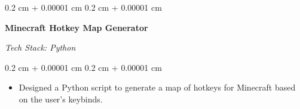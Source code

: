 \documentclass[10pt, a4paper]{article}
\newenvironment{highlights}{
    \begin{itemize}[
        topsep=0.1 cm,
        parsep=0.1 cm,
        partopsep=0pt,
        itemsep=0pt,
        leftmargin=0.4 cm + 10pt
    ]
}{
    \end{itemize}
} %
\newenvironment{onecolentry}{
    \begin{adjustwidth}{
        0.2 cm + 0.00001 cm
    }{
        0.2 cm + 0.00001 cm
    }
}{
    \end{adjustwidth}
} %
\newenvironment{twocolentry}[2][]{
    \onecolentry
    \def\secondColumn{#2}
    \begin{paracol}{2}
}{
    \switchcolumn \raggedleft \secondColumn
    \end{paracol}
    \endonecolentry
} %
\newcommand{\createpointblock}[5]{%
    \begin{twocolentry}{%
        \textit{#2}

        \textit{#4}}
        \textbf{#1}

        \textit{#3}
    \end{twocolentry}

    \vspace{0.1 cm}
    \begin{onecolentry}
        \begin{highlights}
            #5
        \end{highlights}
    \end{onecolentry}
}
\let\hrefWithoutArrow\href
\renewcommand{\href}[2]{\hrefWithoutArrow{#1}{\ifthenelse{\equal{#2}{}}{ }{#2 }\raisebox{.15ex}{\footnotesize \faExternalLink*}}}
\begin{document}



    \createpointblock{Minecraft Hotkey Map Generator\href{https://github.com/abdxdev/minecraft-hotkey-map}{}}{}
    {Tech Stack: Python}{}
    {%
        \item Designed a Python script to generate a map of hotkeys for Minecraft based on the user's keybinds.
    }
\end{document}
